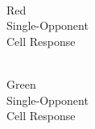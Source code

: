 \documentclass[journal,onecolumn]{IEEEtran}
\begin{document}
\begin{figure}[H]
\begin{subfigure}{0.15\textwidth}
        \caption{\\ Red\\ Single-Opponent\\ Cell Response}
    \end{subfigure}
    \begin{subfigure}{0.15\textwidth}
        \centering
        \captionsetup{justification=centering}
        \caption{\\ Green\\ Single-Opponent\\ Cell Response}
    \end{subfigure}
    \begin{subfigure}{0.15\textwidth}
        \centering
        \captionsetup{justification=centering}

\end{subfigure}
\end{figure}
\end{document}

